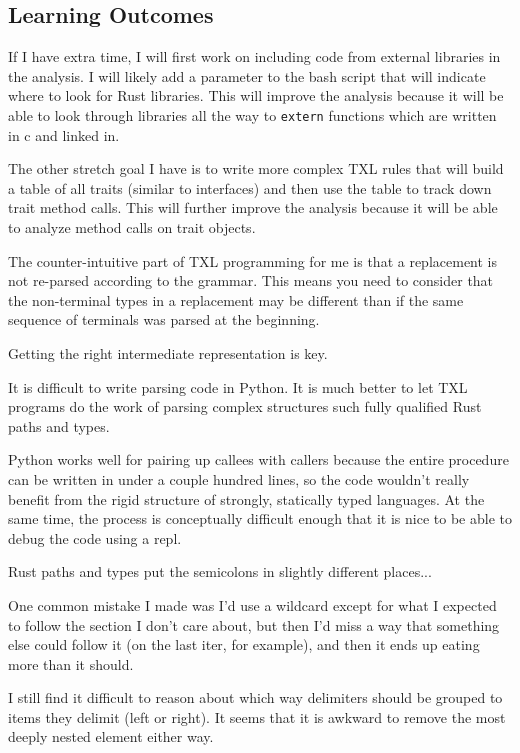 \documentclass[11pt]{article}
\begin{document}
\subsection{Learning Outcomes}
If I have extra time, I will first work on including code from external libraries in the analysis.
I will likely add a parameter to the bash script that will indicate where to look for Rust libraries.
This will improve the analysis because it will be able to look through libraries all the way to \lstinline{extern} functions which are written in c and linked in.

The other stretch goal I have is to write more complex TXL rules that will build a table of all traits (similar to interfaces) and then use the table to track down trait method calls.
This will further improve the analysis because it will be able to analyze method calls on trait objects.

The counter-intuitive part of TXL programming for me is that a replacement is not re-parsed according to the grammar.
This means you need to consider that the non-terminal types in a replacement may be different than if the same sequence of terminals was parsed at the beginning.

Getting the right intermediate representation is key.

It is difficult to write parsing code in Python.
It is much better to let TXL programs do the work of parsing complex structures such fully qualified Rust paths and types.

Python works well for pairing up callees with callers because the entire procedure can be written in under a couple hundred lines, so the code wouldn't really benefit from the rigid structure of strongly, statically typed languages.
At the same time, the process is conceptually difficult enough that it is nice to be able to debug the code using a repl.

Rust paths and types put the semicolons in slightly different places...

One common mistake I made was I'd use a wildcard except for what I expected to follow the section I don't care about, but then I'd miss a way that something else could follow it (on the last iter, for example), and then it ends up eating more than it should.

I still find it difficult to reason about which way delimiters should be grouped to items they delimit (left or right).
It seems that it is awkward to remove the most deeply nested element either way.
\end{document}
